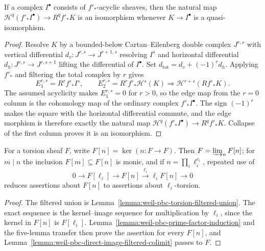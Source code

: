 \begin{lemma}
\label{lemma:weil-pbc-leray-acyclicity}
If a complex $I^\bullet$ consists of $f'_*$-acyclic sheaves, then the natural
map $\mathcal H^q(f'_*I^\bullet)\to R^qf'_*K$ is an isomorphism whenever
$K\to I^\bullet$ is a quasi-isomorphism.
\end{lemma}
\begin{proof}
\uses{} 
Resolve $K$ by a bounded-below Cartan--Eilenberg double complex
$J^{r,s}$ with vertical differential $d_v:J^{r,s}\to J^{r+1,s}$ resolving
$I^s$ and horizontal differential $d_h:J^{r,s}\to J^{r,s+1}$ lifting the
differential of $I^\bullet$.  Set
$d_{\mathrm{tot}}=d_v+(-1)^r d_h$.  Applying $f'_*$ and filtering the total
complex by $r$ gives
\[
 E_1^{r,s}=R^rf'_*I^s,\qquad
 E_2^{r,s}=R^rf'_*\mathcal H^s(K)\Longrightarrow
 \mathcal H^{r+s}(Rf'_*K).
\]
The assumed acyclicity makes $E_1^{r,s}=0$ for $r>0$, so the edge map from
the $r=0$ column is the cohomology map of the ordinary complex
$f'_*I^\bullet$.  The sign $(-1)^r$ makes the square with the horizontal
differential commute, and the edge morphism is therefore exactly the natural
map $\mathcal H^q(f'_*I^\bullet)\to R^qf'_*K$.  Collapse of the first column
proves it is an isomorphism.
\end{proof}

\begin{lemma}
\label{lemma:weil-pbc-prime-torsion-devissage}
\uses{}

For a torsion sheaf $F$, write $F[n]=\ker(n:F\to F)$.  Then
$F=\varinjlim_nF[n]$; for $m\mid n$ the inclusion $F[m]\subseteq F[n]$
is monic, and if $n=\prod_i\ell_i^{e_i}$, repeated use of
\[
 0\longrightarrow F[\ell_i]\longrightarrow F[n]
 \xrightarrow{\ell_i}\ell_iF[n]\longrightarrow0
\]
reduces assertions about $F[n]$ to assertions about $\ell_i$-torsion.
\end{lemma}
\begin{proof}

The filtered union is Lemma~\ref{lemma:weil-pbc-torsion-filtered-union}.
The exact sequence is the kernel--image sequence for multiplication by
$\ell_i$, since the kernel in $F[n]$ is $F[\ell_i]$.  Lemma~\ref{lemma:weil-pbc-prime-factor-induction} and the
five-lemma transfer then prove the assertion for every $F[n]$, and
Lemma~\ref{lemma:weil-pbc-direct-image-filtered-colimit} passes to $F$.
\end{proof}

